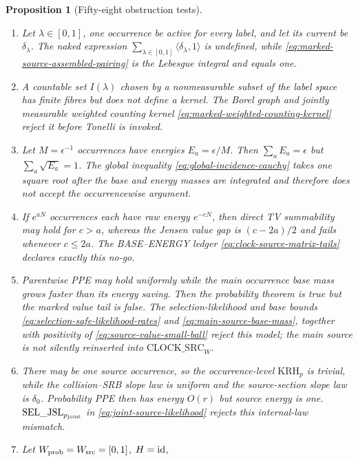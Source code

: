 \documentclass[11pt]{article}
\newtheorem{proposition}[theorem]{Proposition}
\begin{document}
\begin{proposition}[Fifty-eight obstruction tests]
\begin{enumerate}[label=\textup{(T\arabic*)}]
      Definition~\ref{def:source-incidence-space} identifies physical
      occurrences, not event supports, and therefore retains both.
\item Let $\lambda\in[0,1]$, one occurrence be active for every label, and
      let its current be $\delta_\lambda$.  The naked expression
      $\sum_{\lambda\in[0,1]}\langle\delta_\lambda,1\rangle$ is undefined,
      while \eqref{eq:marked-source-assembled-pairing} is the Lebesgue
      integral and equals one.
\item A countable set $I(\lambda)$ chosen by a nonmeasurable subset of the
      label space has finite fibres but does not define a kernel.  The Borel
      graph and jointly measurable weighted counting kernel
      \eqref{eq:marked-weighted-counting-kernel} reject it before Tonelli is
      invoked.
\item Let $M=\epsilon^{-1}$ occurrences have energies
      $E_a=\epsilon/M$.  Then $\sum_aE_a=\epsilon$ but
      $\sum_a\sqrt{E_a}=1$.  The global inequality
      \eqref{eq:global-incidence-cauchy} takes one square root after the base
      and energy masses are integrated and therefore does not accept the
      occurrencewise argument.
\item If $e^{aN}$ occurrences each have raw energy $e^{-cN}$, then direct TV
      summability may hold for $c>a$, whereas the Jensen value gap is
      $(c-2a)/2$ and fails whenever $c\le2a$.  The BASE--ENERGY ledger
      \eqref{eq:clock-source-matrix-tails} declares exactly this no-go.
\item Parentwise PPE may hold uniformly while the main occurrence base mass
      grows faster than its energy saving.  Then the probability theorem is
      true but the marked value tail is false.  The selection-likelihood and
      base bounds \eqref{eq:selection-safe-likelihood-rates} and
      \eqref{eq:main-source-base-mass}, together with positivity of
      \eqref{eq:source-value-small-ball} reject this model; the main source
      is not silently reinserted into $\mathrm{CLOCK\_SRC}_{W}$.
\item There may be one source occurrence, so the occurrence-level
      $\mathrm{KRH}_p$ is trivial, while the collision--SRB slope law is
      uniform and the source-section slope law is $\delta_0$.  Probability
      PPE then has energy $O(r)$ but source energy is one.
      $\mathrm{SEL\_JSL}_{p_{\rm joint}}$ in
      \eqref{eq:joint-source-likelihood} rejects this internal-law mismatch.
\item Let $W_{\rm prob}=W_{\rm src}=[0,1]$, $H={\rm id}$,

\end{enumerate}
\end{proposition}
\end{document}
